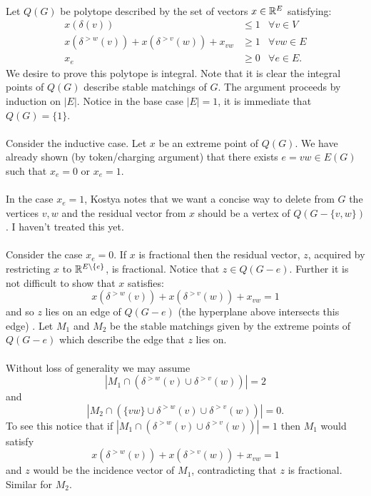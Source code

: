 \documentclass[letterpaper,12pt,oneside,onecolumn]{article}
\begin{document}
\paragraph{}
Let $Q(G)$ be polytope described by the set of vectors $x \in \mathbb{R}^E$ satisfying:
\begin{align*}
x(\delta(v)) &\leq 1 &\forall v \in V\\
x(\delta^{>w}(v))+ x(\delta^{>v}(w)) + x_{vw} &\geq 1 &\forall vw \in E \\
x_e &\geq 0 &\forall e \in E.
\end{align*}
We desire to prove this polytope is integral. Note that it is clear the integral points of $Q(G)$ describe stable matchings of $G$. The argument proceeds by induction on $|E|$. Notice in the base case $|E| = 1$, it is immediate that $Q(G) = \{1\}$.
\paragraph{}
Consider the inductive case. Let $x$ be an extreme point of $Q(G)$. We have already shown (by token/charging argument) that there exists $e=vw \in E(G)$ such that $x_e = 0$ or $x_e = 1$. 
\paragraph{}
In the case $x_e = 1$, Kostya notes that we want a concise way to delete from $G$ the vertices $v,w$ and the residual vector from $x$ should be a vertex of $Q(G-\{v,w\})$. I haven't treated this yet.
\paragraph{}
Consider the case $x_e = 0$. If $x$ is fractional then the residual vector, $z$, acquired by restricting $x$ to $\mathbb{R}^{E\backslash\{e\}}$, is fractional. Notice that $z \in Q(G-e)$. Further it is not difficult to show that $x$ satisfies:
$$x(\delta^{>w}(v))+ x(\delta^{>v}(w)) + x_{vw} = 1$$
and so $z$ lies on an edge of $Q(G-e)$ (the hyperplane above intersects this edge) . Let $M_1$ and $M_2$ be the stable matchings given by the extreme points of $Q(G-e)$ which describe the edge that $z$ lies on.
\paragraph{}
Without loss of generality we may assume
$$ |M_1 \cap(\delta^{>w}(v) \cup \delta^{>v}(w))| = 2 $$
and 
$$ |M_2 \cap(\{vw\} \cup \delta^{>w}(v) \cup \delta^{>v}(w))| = 0.$$
To see this notice that if $|M_1 \cap(\delta^{>w}(v) \cup \delta^{>v}(w))| = 1$ then $M_1$ would satisfy $$x(\delta^{>w}(v))+ x(\delta^{>v}(w)) + x_{vw} = 1$$ and $z$ would be the incidence vector of $M_1$, contradicting that $z$ is fractional. Similar for $M_2$.
\end{document}
